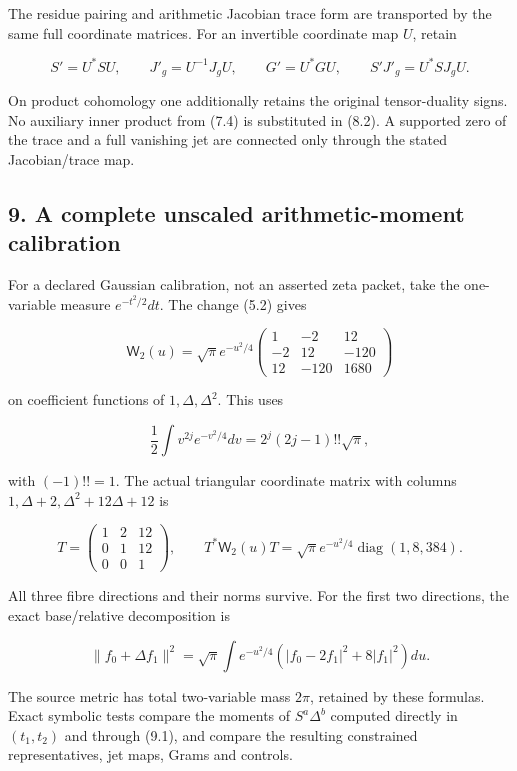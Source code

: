 \documentclass[
]{article}
\begin{document}
The residue pairing and arithmetic Jacobian trace form are transported
by the same full coordinate matrices. For an invertible coordinate map
\(U\), retain

\[S'=U^*S U,\qquad J'_g=U^{-1}J_gU,\qquad G'=U^*G U,\qquad
S'J'_g=U^*S J_gU.\tag{8.2}\]

On product cohomology one additionally retains the original
tensor-duality signs. No auxiliary inner product from (7.4) is
substituted in (8.2). A supported zero of the trace and a full vanishing
jet are connected only through the stated Jacobian/trace map.

\subsection{9. A complete unscaled arithmetic-moment
calibration}\label{a-complete-unscaled-arithmetic-moment-calibration}

For a declared Gaussian calibration, not an asserted zeta packet, take
the one-variable measure \(e^{-t^2/2}dt\). The change (5.2) gives

\[\mathsf W_2(u)=\sqrt\pi e^{-u^2/4}
\begin{pmatrix}
1&-2&12\\-2&12&-120\\12&-120&1680
\end{pmatrix}\tag{9.1}\]

on coefficient functions of \(1,\Delta,\Delta^2\). This uses

\[\frac12\int v^{2j}e^{-v^2/4}dv=2^j(2j-1)!!\sqrt\pi,\]

with \((-1)!!=1\). The actual triangular coordinate matrix with columns
\(1,\Delta+2,\Delta^2+12\Delta+12\) is

\[T=\begin{pmatrix}1&2&12\\0&1&12\\0&0&1\end{pmatrix},\qquad
T^*\mathsf W_2(u)T=\sqrt\pi e^{-u^2/4}\operatorname{diag}(1,8,384).\tag{9.2}\]

All three fibre directions and their norms survive. For the first two
directions, the exact base/relative decomposition is

\[\|f_0+\Delta f_1\|^2
=\sqrt\pi\int e^{-u^2/4}\left(|f_0-2f_1|^2+8|f_1|^2\right)du.\tag{9.3}\]

The source metric has total two-variable mass \(2\pi\), retained by
these formulas. Exact symbolic tests compare the moments of
\(S^a\Delta^b\) computed directly in \((t_1,t_2)\) and through (9.1),
and compare the resulting constrained representatives, jet maps, Grams
and controls.
\end{document}
